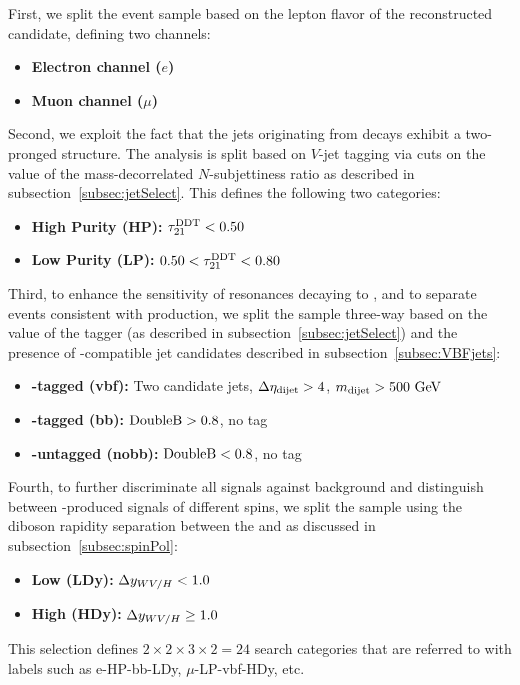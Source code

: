 First, we split the event sample based on the lepton flavor of the reconstructed \Wlep candidate, defining two channels:
\begin{itemize}
  \item {\bfseries Electron channel ($e$)}
  \item {\bfseries Muon channel ($\mu$)}
\end{itemize}

Second, we exploit the fact that the jets originating from \VorH decays exhibit a two-pronged structure.
The analysis is split based on $V$-jet tagging via cuts on the value of the mass-decorrelated $N$-subjettiness ratio \nsubjDDT as described in subsection~\ref{subsec:jetSelect}.
This defines the following two categories:
\begin{itemize}
  \item {\bfseries High Purity (HP):} $\nsubjDDT<0.50$
  \item {\bfseries Low Purity (LP):} $0.50<\nsubjDDT<0.80$
\end{itemize}

Third, to enhance the sensitivity of resonances decaying to \WHtolnubbbar, and to separate events consistent with \VBF production, we split the sample three-way based on the value of the \DoubleB tagger (as described in subsection~\ref{subsec:jetSelect}) and the presence of \VBF-compatible jet candidates described in subsection~\ref{subsec:VBFjets}:
\begin{itemize}
  \item {\bfseries \VBF-tagged (vbf):} Two candidate \VBF jets, $\DetaVBF>4$, $\mjjVBF>500\unit{GeV}$
  \item {\bfseries \bbbar-tagged (bb):} $\DoubleB>0.8$, no \VBF tag
  \item {\bfseries \bbbar-untagged (nobb):} $\DoubleB<0.8$, no \VBF tag
\end{itemize}

Fourth, to further discriminate all signals against background and distinguish between \VBF-produced signals of different spins, we split the sample using the diboson rapidity separation \Dy between the \Wlep and \Vhad as discussed in subsection~\ref{subsec:spinPol}:
\begin{itemize}
  \item {\bfseries Low \Dy (LDy):} $\Dy<1.0$
  \item {\bfseries High \Dy (HDy):} $\Dy\geq1.0$
\end{itemize}

This selection defines $2\times2\times3\times2=24$ search categories that are referred to with labels such as e-HP-bb-LDy, $\mu$-LP-vbf-HDy, etc.
